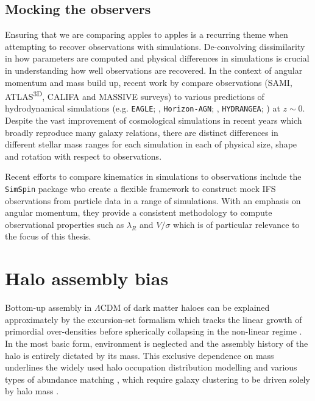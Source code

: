 \subsection{Mocking the observers}
Ensuring that we are comparing apples to apples is a recurring theme when attempting to recover observations with simulations. De-convolving dissimilarity in how parameters are computed and physical differences in simulations is crucial in understanding how well observations are recovered. In the context of angular momentum and mass build up, recent work by \citet{sande2019} compare observations (SAMI, ATLAS\textsuperscript{3D}, CALIFA and MASSIVE surveys) to various predictions of hydrodynamical simulations (e.g. \texttt{EAGLE}; \citet{schaye2015}, \texttt{Horizon-AGN}; \citet{dubois2014}, \texttt{HYDRANGEA}; \citet{bahe2017}) at $z \sim 0$. Despite the vast improvement of cosmological simulations in recent years which broadly reproduce many galaxy relations, there are distinct differences in different stellar mass ranges for each simulation in each of physical size, shape and rotation with respect to observations.

Recent efforts to compare kinematics in simulations to observations include the \texttt{SimSpin} package \citep{harborne2019, harborne2020} who create a flexible framework to construct mock IFS observations from particle data in a range of simulations. With an emphasis on angular momentum, they provide a consistent methodology to compute observational properties such as $\lambda_R$ and $V/\sigma$ which is of particular relevance to the focus of this thesis.


\section{Halo assembly bias} \label{sec:halo_assembly_bias_intro}
Bottom-up assembly in $\Lambda$CDM of dark matter haloes can be explained approximately by the excursion-set formalism which tracks the linear growth of primordial over-densities before spherically collapsing in the non-linear regime \citep{press1974,bond1991}. In the most basic form, environment is neglected and the assembly history of the halo is entirely dictated by its mass. This exclusive dependence on mass underlines the widely used halo occupation distribution \citep[HOD; e.g.][]{jing1998,peacock2000} modelling and various types of abundance matching \citep[e.g.][]{kravtsov2004,conroy2006}, which require galaxy clustering to be driven solely by halo mass \citep[e.g.][]{mo1996,sheth1999}. 

